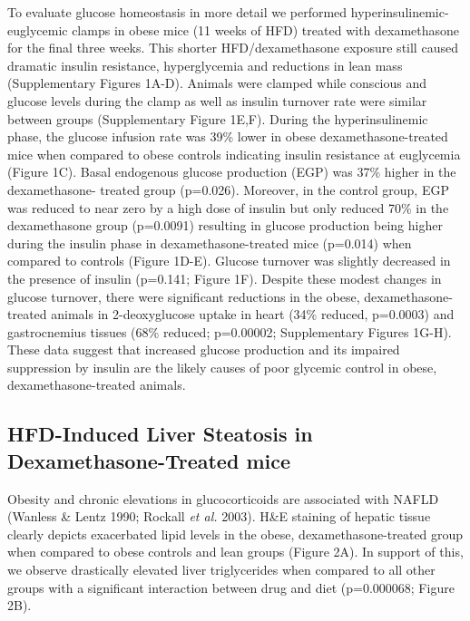 \documentclass[11pt]{article} %
\begin{document}
To evaluate glucose homeostasis in more detail we performed
hyperinsulinemic-euglycemic clamps in obese mice (11 weeks of HFD)
treated with dexamethasone for the final three weeks. This shorter
HFD/dexamethasone exposure still caused dramatic insulin resistance,
hyperglycemia and reductions in lean mass (Supplementary Figures 1A-D).
Animals were clamped while conscious and glucose levels during the clamp
as well as insulin turnover rate were similar between groups
(Supplementary Figure 1E,F). During the hyperinsulinemic phase, the
glucose infusion rate was 39\% lower in obese dexamethasone-treated mice
when compared to obese controls indicating insulin resistance at
euglycemia (Figure 1C). Basal endogenous glucose production (EGP) was
37\% higher in the dexamethasone- treated group (p=0.026). Moreover, in
the control group, EGP was reduced to near zero by a high dose of
insulin but only reduced 70\% in the dexamethasone group (p=0.0091)
resulting in glucose production being higher during the insulin phase in
dexamethasone-treated mice (p=0.014) when compared to controls (Figure
1D-E). Glucose turnover was slightly decreased in the presence of
insulin (p=0.141; Figure 1F). Despite these modest changes in glucose
turnover, there were significant reductions in the obese,
dexamethasone-treated animals in 2-deoxyglucose uptake in heart (34\%
reduced, p=0.0003) and gastrocnemius tissues (68\% reduced; p=0.00002;
Supplementary Figures 1G-H). These data suggest that increased glucose
production and its impaired suppression by insulin are the likely causes
of poor glycemic control in obese, dexamethasone-treated animals.

\subsection*{HFD-Induced Liver Steatosis in Dexamethasone-Treated
mice}

Obesity and chronic elevations in glucocorticoids are associated with
NAFLD (Wanless \& Lentz 1990; Rockall \emph{et al.} 2003). H\&E staining
of hepatic tissue clearly depicts exacerbated lipid levels in the obese,
dexamethasone-treated group when compared to obese controls and lean
groups (Figure 2A). In support of this, we observe drastically elevated
liver triglycerides when compared to all other groups with a significant
interaction between drug and diet (p=0.000068; Figure 2B).
\end{document}

